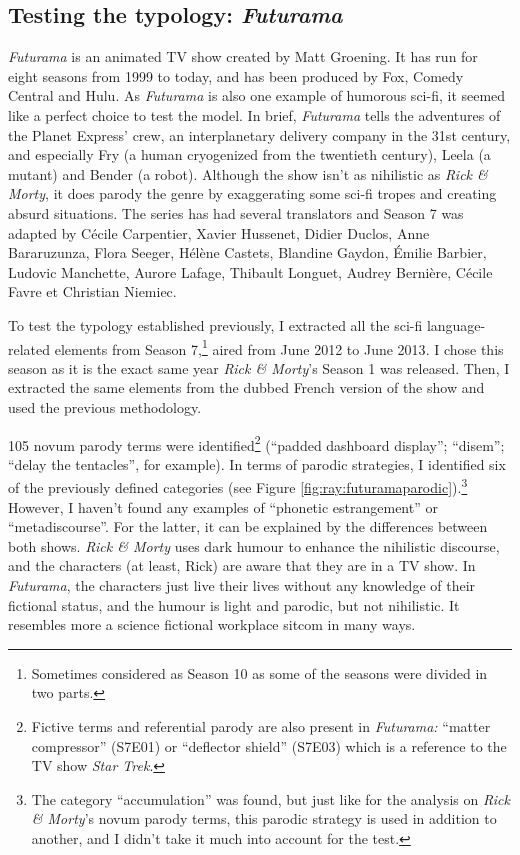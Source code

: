 \documentclass[output=paper]{langscibook}
\begin{document}
\subsection{Testing the typology: \textit{Futurama}}

\textit{Futurama} is an animated TV show created by Matt Groening. It has run for eight seasons from 1999 to today, and has been produced by Fox, Comedy Central and Hulu. As \textit{Futurama} is also one example of humorous sci-fi, it seemed like a perfect choice to test the model. In brief, \textit{Futurama} tells the adventures of the Planet Express’ crew, an interplanetary delivery company in the 31st century, and especially Fry (a human cryogenized from the twentieth century), Leela (a mutant) and Bender (a robot). Although the show isn’t as nihilistic as \textit{Rick \& Morty}, it does parody the genre by exaggerating some sci-fi tropes and creating absurd situations. {The series has had several translators and Season 7 was adapted by Cécile Carpentier, Xavier Hussenet, Didier Duclos, Anne Bararuzunza, Flora Seeger, Hélène Castets, Blandine Gaydon, Émilie Barbier, Ludovic Manchette, Aurore Lafage, Thibault Longuet, Audrey Bernière, Cécile Favre et Christian Niemiec.}

To test the typology established previously, I extracted all the sci-fi language-related elements from Season 7,\footnote{Sometimes considered as Season 10 as some of the seasons were divided in two parts.} aired from  {June 2012} to  {June 2013}. I chose this season as it is the exact same year \textit{Rick \& Morty}’s Season 1 was released. Then, I extracted the same elements from the dubbed French version of the show and used the previous methodology.

105 novum parody terms were identified\footnote{Fictive terms and referential parody are also present in \textit{Futurama:} “matter compressor” (S7E01) or “deflector shield” (S7E03) which is a reference to the TV show \textit{Star Trek}.} (“padded dashboard display”; “disem”; “delay the tentacles”, for example). In terms of parodic strategies, I identified six of the previously defined categories (see Figure \ref{fig:ray:futuramaparodic}).\footnote{The category “accumulation” was found, but just like for the analysis on \textit{Rick \& Morty}’s novum parody terms, this parodic strategy is used in addition to another, and I didn’t take it much into account for the test.} However, I haven’t found any examples of “phonetic estrangement” or “metadiscourse”. For the latter, it can be explained by the differences between both shows. \textit{Rick \& Morty} uses dark humour to enhance the nihilistic discourse, and the characters (at least, Rick) are aware that they are in a TV show. In \textit{Futurama}, the characters just live their lives without any knowledge of their fictional status, and the humour is light and parodic, but not nihilistic. It resembles more a science fictional workplace sitcom in many ways.
\end{document}
